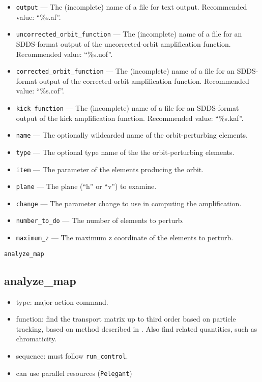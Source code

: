 \documentclass[11pt]{article}
\begin{document}
\begin{itemize}
\item \verb|output| ---  The (incomplete) name of a file for text output.   Recommended value: ``\%s.af''.
\item \verb|uncorrected_orbit_function| --- The (incomplete) name of a file for an SDDS-format output of the
    uncorrected-orbit amplification function.  Recommended value: ``\%s.uof''.
\item \verb|corrected_orbit_function| --- The (incomplete) name of a file for an SDDS-format output of the
    corrected-orbit amplification function.  Recommended value: ``\%s.cof''.
\item \verb|kick_function| --- The (incomplete) name of a file for an SDDS-format output of the kick amplification function.
Recommended value: ``\%s.kaf''.
\item \verb|name| --- The optionally wildcarded name of the orbit-perturbing elements.  
\item \verb|type| --- The optional type name of the the orbit-perturbing elements.
\item \verb|item| --- The parameter of the elements producing the orbit.
\item \verb|plane| --- The plane (``h'' or ``v'') to examine.
\item \verb|change| --- The parameter change to use in computing the amplification.  
\item \verb|number_to_do| --- The number of elements to perturb.
\item \verb|maximum_z| --- The maximum z coordinate of the elements to perturb.
\end{itemize}

\newpage
\begin{center}{\Large\verb|analyze_map|}\end{center}
\subsection{analyze\_map \label{subsec:analyzemap}}

\begin{itemize}
\item type: major action command.
\item function: find the transport matrix up to third order based on particle tracking, based on method described
  in \cite{Borland_thesis}.
  Also find related quantities, such as chromaticity.
\item sequence: must follow \verb|run_control|.
\item can use parallel resources (\verb|Pelegant|)
\end{itemize}
\end{document}
